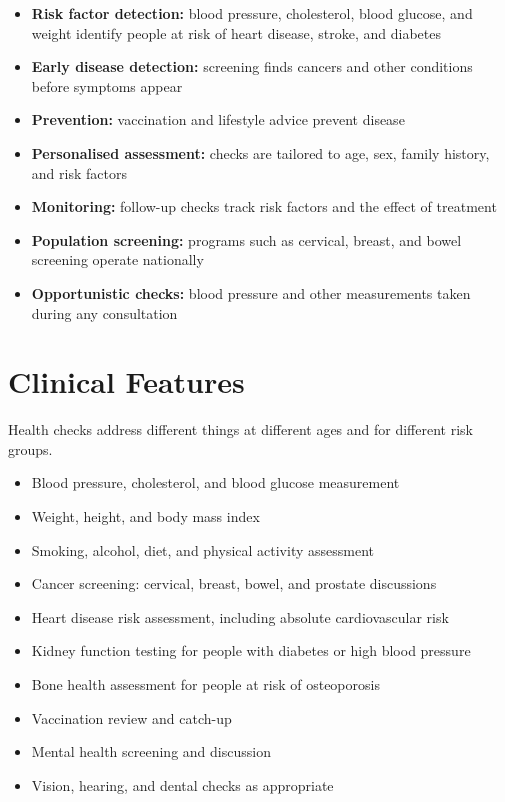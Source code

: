 \begin{itemize}
    \item \textbf{Risk factor detection:} blood pressure, cholesterol, blood glucose, and weight identify people at risk of heart disease, stroke, and diabetes
    \item \textbf{Early disease detection:} screening finds cancers and other conditions before symptoms appear
    \item \textbf{Prevention:} vaccination and lifestyle advice prevent disease
    \item \textbf{Personalised assessment:} checks are tailored to age, sex, family history, and risk factors
    \item \textbf{Monitoring:} follow-up checks track risk factors and the effect of treatment
    \item \textbf{Population screening:} programs such as cervical, breast, and bowel screening operate nationally
    \item \textbf{Opportunistic checks:} blood pressure and other measurements taken during any consultation
\end{itemize}

\section*{Clinical Features}
Health checks address different things at different ages and for different risk groups.

\begin{itemize}
    \item Blood pressure, cholesterol, and blood glucose measurement
    \item Weight, height, and body mass index
    \item Smoking, alcohol, diet, and physical activity assessment
    \item Cancer screening: cervical, breast, bowel, and prostate discussions
    \item Heart disease risk assessment, including absolute cardiovascular risk
    \item Kidney function testing for people with diabetes or high blood pressure
    \item Bone health assessment for people at risk of osteoporosis
    \item Vaccination review and catch-up
    \item Mental health screening and discussion
    \item Vision, hearing, and dental checks as appropriate
\end{itemize}

